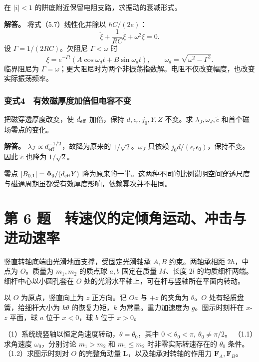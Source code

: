 \documentclass[12pt,a4paper,fontset=fandol]{ctexart}
\begin{document}
在 \(|i|<1\) 的阱底附近保留电阻支路，求振动的衰减形式。

\textbf{解答。} 将式（5.7）线性化并除以 \(\hbar C/(2e)\)： \[
\ddot\xi+\frac1{RC}\dot\xi+\omega^2\xi=0.
\] 设 \(\Gamma=1/(2RC)\)。欠阻尼 \(\Gamma<\omega\) 时 \[
\xi=e^{-\Gamma t}
(A\cos\omega_dt+B\sin\omega_dt),\qquad
\omega_d=\sqrt{\omega^2-\Gamma^2}.
\] 临界阻尼为
\(\Gamma=\omega\)；更大阻尼时为两个非振荡指数解。电阻不仅改变幅度，也改变实际振荡频率。

\subsubsection{变式4　有效磁厚度加倍但电容不变}\label{ux53d8ux5f0f4-ux6709ux6548ux78c1ux539aux5ea6ux52a0ux500dux4f46ux7535ux5bb9ux4e0dux53d8}

把磁穿透厚度改变，使 \(d_{\rm eff}\) 加倍，保持 \(d,\epsilon_r,j_0,Y,Z\)
不变。求 \(\lambda_J,\omega_J,\tilde c\) 和首个磁场零点的变化。

\textbf{解答。} \(\lambda_J\propto d_{\rm eff}^{-1/2}\)，故降为原来的
\(1/\sqrt2\)。\(\omega_J\) 只依赖
\(j_0d/(\epsilon_r\epsilon_0)\)，保持不变。因此 \(\tilde c\) 也降为
\(1/\sqrt2\)。

零点 \(|B_{0,1}|=\Phi_0/(d_{\rm eff}Y)\)
降为原来的一半。这两种不同的比例说明空间穿透尺度与磁通周期虽都受有效厚度影响，依赖幂次并不相同。

\clearpage

\section{第 6
题　转速仪的定倾角运动、冲击与进动速率}\label{ux7b2c-6-ux9898-ux8f6cux901fux4eeaux7684ux5b9aux503eux89d2ux8fd0ux52a8ux51b2ux51fbux4e0eux8fdbux52a8ux901fux7387}

竖直转轴底端由光滑地面支撑，受固定光滑轴承 \(A,B\) 约束。两轴承相距
\(2h\)，中点为 \(O\)。质量为 \(m_1,m_2\) 的质点球 \(a,b\) 固定在质量
\(M\)、长度 \(2l\) 的均质细杆两端。细杆中心以小圆孔套在 \(O\)
处的光滑水平轴上，可在杆与竖轴所在平面内转动。

以 \(O\) 为原点，竖直向上为 \(z\) 正方向。记 \(Oa\) 与 \(+z\) 的夹角为
\(\theta\)。\(O\) 处有轻质盘簧，给细杆大小为 \(k\theta\)
的恢复力矩，\(k\) 为常量。重力加速度为 \(g\)。图示时刻杆在 \(x\)-\(z\)
平面，球 \(a\) 位于 \(x<0\)，球 \(b\) 位于 \(x>0\)。

（1）系统绕竖轴以恒定角速度转动，\(\theta=\theta_0\)，其中
\(0<\theta_0<\pi,\ \theta_0\ne\pi/2\)。 （1.1）求角速度
\(\omega_0\)，分别讨论 \(m_1>m_2\) 和 \(m_1\le m_2\)
时非零实际转速存在的 \(\theta_0\) 条件。 （1.2）求图示时刻对 \(O\)
的完整角动量 \(\mathbf L\)，以及轴承对转轴的作用力
\(\mathbf F_A,\mathbf F_B\)。
\end{document}
